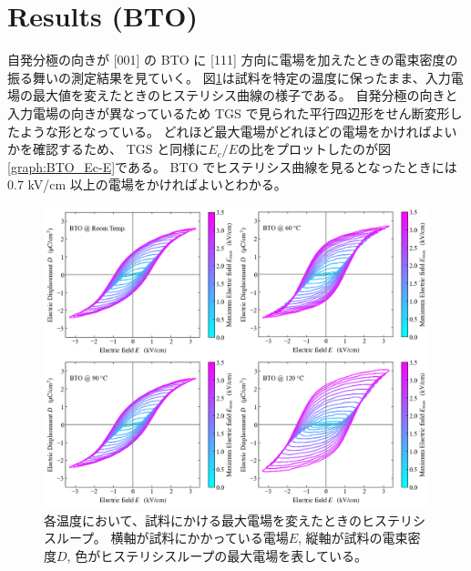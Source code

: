 \documentclass[11pt,dvipdfmx,a4paper]{jsarticle}
\begin{document}
\section{Results (BTO)}
自発分極の向きが [001] の BTO に [111] 方向に電場を加えたときの電束密度の振る舞いの測定結果を見ていく。
図\ref{graph:BTO_D-E_Ec}は試料を特定の温度に保ったまま、入力電場の最大値を変えたときのヒステリシス曲線の様子である。
自発分極の向きと入力電場の向きが異なっているため TGS で見られた平行四辺形をせん断変形したような形となっている。
どれほど最大電場がどれほどの電場をかければよいかを確認するため、
TGS と同様に\(E_c/E\)の比をプロットしたのが図\ref{graph:BTO_Ec-E}である。
BTO でヒステリシス曲線を見るとなったときには 0.7 kV/cm 以上の電場をかければよいとわかる。
\begin{figure}[H]
    \centering
    \begin{minipage}{0.58\columnwidth}
        \centering
        \includegraphics[width=\columnwidth]{BTO_D-E_temp.png}
        \caption{\small{各温度において、試料にかける最大電場を変えたときのヒステリシスループ。
        横軸が試料にかかっている電場\(E\), 縦軸が試料の電束密度\(D\), 色がヒステリシスループの最大電場を表している。}}
        \label{graph:BTO_D-E_Ec}
    \end{minipage}
    \hfill
    \begin{minipage}{0.4\columnwidth}
        \centering

\end{minipage}
\end{figure}
\end{document}
